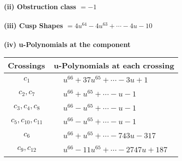 \documentclass[1p]{elsarticle_modified}
\theoremstyle{definition}
\begin{document}
\flushleft \textbf{(ii) Obstruction class $= -1$}\\~\\
\flushleft \textbf{(iii) Cusp Shapes $= 4 u^{64}-4 u^{63}+\cdots-4 u-10$}\\~\\
\newpage\renewcommand{\arraystretch}{1}
\flushleft \textbf{(iv) u-Polynomials at the component}\newline \\
\begin{tabular}{m{50pt}|m{274pt}}
Crossings & \hspace{64pt}u-Polynomials at each crossing \\
\hline $$\begin{aligned}c_{1}\end{aligned}$$&$\begin{aligned}
&u^{66}+37 u^{65}+\cdots-3 u+1
\end{aligned}$\\
\hline $$\begin{aligned}c_{2},c_{7}\end{aligned}$$&$\begin{aligned}
&u^{66}+u^{65}+\cdots- u-1
\end{aligned}$\\
\hline $$\begin{aligned}c_{3},c_{4},c_{8}\end{aligned}$$&$\begin{aligned}
&u^{66}- u^{65}+\cdots- u-1
\end{aligned}$\\
\hline $$\begin{aligned}c_{5},c_{10},c_{11}\end{aligned}$$&$\begin{aligned}
&u^{66}- u^{65}+\cdots- u-1
\end{aligned}$\\
\hline $$\begin{aligned}c_{6}\end{aligned}$$&$\begin{aligned}
&u^{66}+u^{65}+\cdots-743 u-317
\end{aligned}$\\
\hline $$\begin{aligned}c_{9},c_{12}\end{aligned}$$&$\begin{aligned}
&u^{66}-11 u^{65}+\cdots-2747 u+187
\end{aligned}$\\
\hline
\end{tabular}\\~\\
\end{document}
